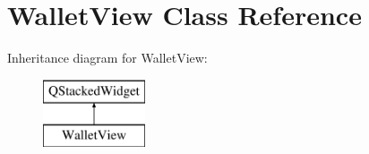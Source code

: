 \hypertarget{class_wallet_view}{}\section{Wallet\+View Class Reference}
\label{class_wallet_view}
Inheritance diagram for Wallet\+View\+:\begin{figure}[H]
\begin{center}
\leavevmode
\includegraphics[height=2.000000cm]{class_wallet_view}
\end{center}
\end{figure}
